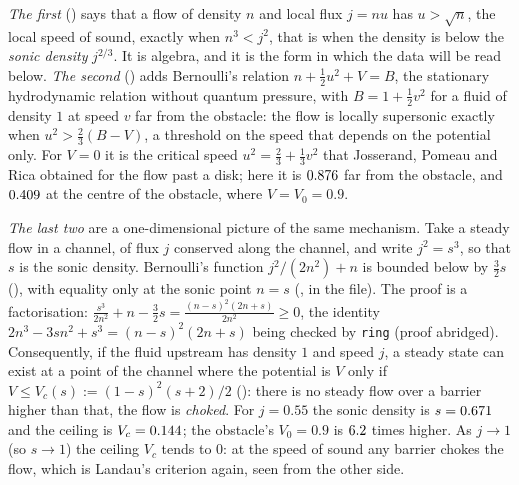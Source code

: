 \emph{The first} () says that a flow of density $n$ and local flux $j=nu$ has $u>\sqrt n$, the local speed of sound, exactly when $n^3<j^2$, that is when the density is below the \emph{sonic density} $j^{2/3}$. It is algebra, and it is the form in which the data will be read below. \emph{The second} () adds Bernoulli's relation $n+\tfrac12u^2+V=B$, the stationary hydrodynamic relation without quantum pressure, with $B=1+\tfrac12v^2$ for a fluid of density $1$ at speed $v$ far from the obstacle: the flow is locally supersonic exactly when $u^2>\tfrac23(B-V)$, a threshold on the speed that depends on the potential only. For $V=0$ it is the critical speed $u^2=\tfrac23+\tfrac13v^2$ that Josserand, Pomeau and Rica obtained for the flow past a disk; here it is $0.876$ far from the obstacle, and $0.409$ at the centre of the obstacle, where $V=V_0=0.9$.

\emph{The last two} are a one-dimensional picture of the same mechanism. Take a steady flow in a channel, of flux $j$ conserved along the channel, and write $j^2=s^3$, so that $s$ is the sonic density. Bernoulli's function $j^2/(2n^2)+n$ is bounded below by $\tfrac32s$ (), with equality only at the sonic point $n=s$ (, in the file). The proof is a factorisation: $\frac{s^3}{2n^2}+n-\frac32s=\frac{(n-s)^2(2n+s)}{2n^2}\ge0$, the identity $2n^3-3sn^2+s^3=(n-s)^2(2n+s)$ being checked by \texttt{ring} (proof abridged). Consequently, if the fluid upstream has density $1$ and speed $j$, a steady state can exist at a point of the channel where the potential is $V$ only if $V\le V_c(s):=(1-s)^2(s+2)/2$ (): there is no steady flow over a barrier higher than that, the flow is \emph{choked}. For $j=0.55$ the sonic density is $s=0.671$ and the ceiling is $V_c=0.144$; the obstacle's $V_0=0.9$ is $6.2$ times higher. As $j\to1$ (so $s\to1$) the ceiling $V_c$ tends to $0$: at the speed of sound any barrier chokes the flow, which is Landau's criterion again, seen from the other side.

